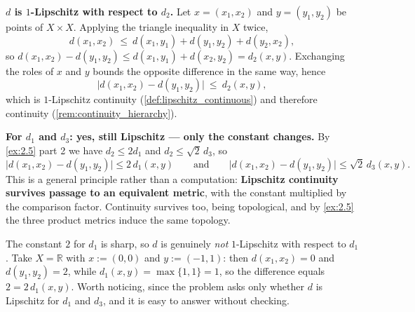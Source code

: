 \begin{exercisesolution}
\textbf{$d$ is $1$-Lipschitz with respect to $d_2$.} Let $x = (x_1,x_2)$ and $y = (y_1,y_2)$ be
points of $X\times X$. Applying the triangle inequality in $X$ twice,
\[d(x_1,x_2) \ \leq\ d(x_1,y_1) + d(y_1,y_2) + d(y_2,x_2),\]
so $d(x_1,x_2) - d(y_1,y_2) \leq d(x_1,y_1) + d(x_2,y_2) = d_2(x,y)$. Exchanging the roles of
$x$ and $y$ bounds the opposite difference in the same way, hence
\[\big|d(x_1,x_2) - d(y_1,y_2)\big| \ \leq\ d_2(x,y),\]
which is $1$-Lipschitz continuity (\cref{def:lipschitz_continuous}) and therefore continuity
(\cref{rem:continuity_hierarchy}).

\textbf{For $d_1$ and $d_3$: yes, still Lipschitz --- only the constant changes.} By
\cref{ex:2.5} part 2 we have $d_2 \leq 2d_1$ and $d_2 \leq \sqrt2\,d_3$, so
\[\big|d(x_1,x_2)-d(y_1,y_2)\big| \leq 2\,d_1(x,y)
  \qquad\text{and}\qquad
  \big|d(x_1,x_2)-d(y_1,y_2)\big| \leq \sqrt2\,d_3(x,y).\]
This is a general principle rather than a computation: \textbf{Lipschitz continuity survives
passage to an equivalent metric}, with the constant multiplied by the comparison factor.
Continuity survives too, being topological, and by \cref{ex:2.5} the three product metrics
induce the same topology.

\begin{ainote}
The constant $2$ for $d_1$ is sharp, so $d$ is genuinely \emph{not} $1$-Lipschitz with respect
to $d_1$. Take $X = \mathbb{R}$ with $x := (0,0)$ and $y := (-1,1)$: then $d(x_1,x_2) = 0$ and
$d(y_1,y_2) = 2$, while $d_1(x,y) = \max\{1,1\} = 1$, so the difference equals
$2 = 2\,d_1(x,y)$. Worth noticing, since the problem asks only whether $d$ is Lipschitz for
$d_1$ and $d_3$, and it is easy to answer  without checking.
\end{ainote}
\end{exercisesolution}

